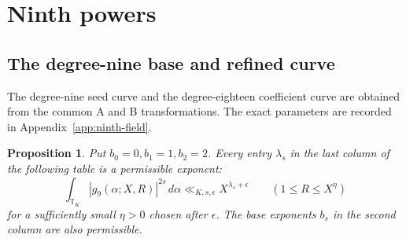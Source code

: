 \documentclass[11pt]{amsart}
\newtheorem{proposition}[theorem]{Proposition}
\theoremstyle{definition}
\numberwithin{equation}{section}
\begin{document}
\section{Ninth powers}
\label{sec:ninth-field-seeds}

\subsection{The degree-nine base and refined curve}

The degree-nine seed curve and the degree-eighteen coefficient
curve are obtained from the common A and B transformations.
The exact parameters are recorded in Appendix~\ref{app:ninth-field}.

\begin{proposition}\label{prop:ninth-field-seed-curve}
Put $b_0=0,b_1=1,b_2=2$.  Every entry $\lambda_s$ in the last column
of the following table is a permissible exponent:
\[
 \int_{\mathbb T_K}|g_9(\alpha;X,R)|^{2s}\,d\alpha
       \ll_{K,s,\epsilon}X^{\lambda_s+\epsilon}
       \qquad(1\le R\le X^\eta)
\]
for a sufficiently small $\eta>0$ chosen after $\epsilon$.
The base exponents $b_s$ in the second column are also permissible.
\end{proposition}
\end{document}
